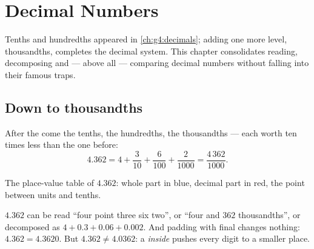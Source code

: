 \chapter{Decimal Numbers}\label{ch:g5:decimals}

Tenths and hundredths appeared in \cref{ch:g4:decimals}; adding one
more level, thousandths, completes the decimal system. This chapter
consolidates reading, decomposing and --- above all --- comparing
decimal numbers without falling into their famous traps.

\section{Down to thousandths}

\begin{definition}\label{def:g5:decimals:places}
After the  come the tenths, the hundredths, the
thousandths --- each worth ten times less than the one before:
\[
4.362 = 4 + \frac{3}{10} + \frac{6}{100} + \frac{2}{1000}
= \frac{4\,362}{1000}.
\]
\end{definition}

\begin{omfigure}

{\small The place-value table of $4.362$: whole part in blue, decimal
part in red, the point between units and tenths.}
\end{omfigure}

\begin{example}\label{ex:g5:decimals:readings}
$4.362$ can be read ``four point three six two'', or ``four and
$362$ thousandths'', or decomposed as $4 + 0.3 + 0.06 + 0.002$. And
padding with final  changes nothing: $4.362 = 4.3620$. But
$4.362 \neq 4.0362$: a  \emph{inside} pushes every digit to a
smaller place.
\end{example}


